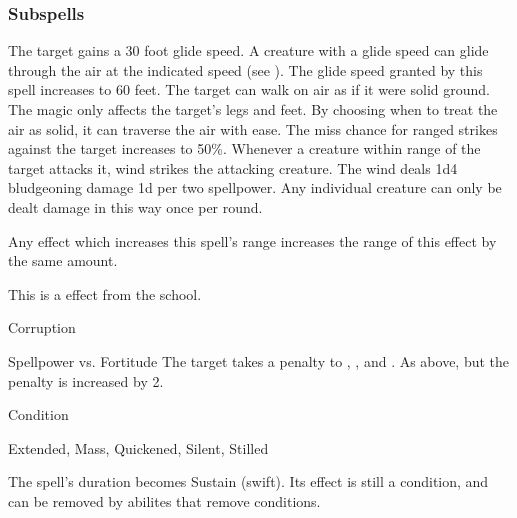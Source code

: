 \subsubsection{Subspells}
The target gains a 30 foot glide speed.
A creature with a glide speed can glide through the air at the indicated speed (see ).
The glide speed granted by this spell increases to 60 feet.
The target can walk on air as if it were solid ground.
The magic only affects the target's legs and feet.
By choosing when to treat the air as solid, it can traverse the air with ease.
The miss chance for ranged strikes against the target increases to 50\%.
Whenever a creature within \rngclose range of the target attacks it, wind strikes the attacking creature.
The wind deals 1d4 bludgeoning damage \add 1d per two spellpower.
Any individual creature can only be dealt damage in this way once per round.
\par Any effect which increases this spell's range increases the range of this effect by the same amount.
\par
This is a  effect from the  school.
\begin{spellsection}{Corruption}
\begin{spellheader}
\end{spellheader}
\begin{spellcontent}
\begin{spelltargetinginfo}
\end{spelltargetinginfo}
\begin{spelleffects}
\begin{spellattack}{Spellpower vs. Fortitude}
\spellsuccess
The target takes a  penalty to , , and .
\spellcritical
As above, but the penalty is increased by 2.
\end{spellattack}
\spelldur Condition
\end{spelleffects}
\end{spellcontent}
\begin{spellfooter}
 Extended, Mass, Quickened, Silent, Stilled
\end{spellfooter}
\begin{spellsubcontent}
\begin{spellcantrip}
The spell's duration becomes Sustain (swift).
Its effect is still a condition, and can be removed by abilites that remove conditions.
\end{spellcantrip}
\end{spellsubcontent}
\end{spellsection}
